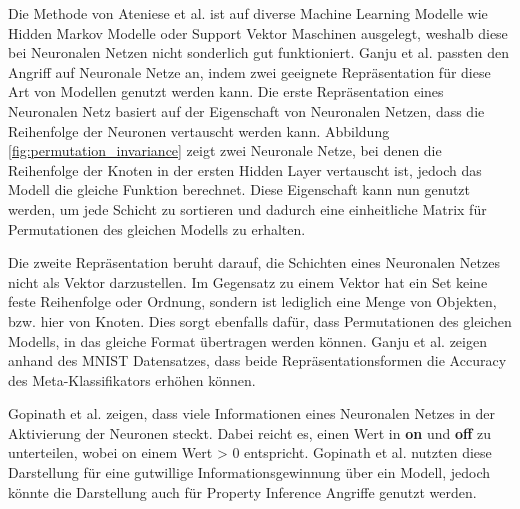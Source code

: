 Die Methode von Ateniese et al. \cite{P-80} ist auf diverse Machine Learning Modelle wie Hidden Markov Modelle oder Support Vektor Maschinen ausgelegt, weshalb diese bei Neuronalen Netzen nicht sonderlich gut funktioniert. 
Ganju et al. \cite{P-11} passten den Angriff auf Neuronale Netze an, indem zwei geeignete Repräsentation für diese Art von Modellen genutzt werden kann.
Die erste Repräsentation eines Neuronalen Netz basiert auf der Eigenschaft von Neuronalen Netzen, dass die Reihenfolge der Neuronen vertauscht werden kann. 
Abbildung \ref{fig:permutation_invariance} zeigt zwei Neuronale Netze, bei denen die Reihenfolge der Knoten in der ersten Hidden Layer vertauscht ist, jedoch das Modell die gleiche Funktion berechnet.
Diese Eigenschaft kann nun genutzt werden, um jede Schicht zu sortieren und dadurch eine einheitliche Matrix für Permutationen des gleichen Modells zu erhalten.

Die zweite Repräsentation beruht darauf, die Schichten eines Neuronalen Netzes nicht als Vektor darzustellen.
Im Gegensatz zu einem Vektor hat ein Set keine feste Reihenfolge oder Ordnung, sondern ist lediglich eine Menge von Objekten, bzw. hier von Knoten.
Dies sorgt ebenfalls dafür, dass Permutationen des gleichen Modells, in das gleiche Format übertragen werden können.
Ganju et al. \cite{P-11} zeigen anhand des MNIST Datensatzes, dass beide Repräsentationsformen die Accuracy des Meta-Klassifikators erhöhen können.

Gopinath et al. \cite{P-12} zeigen, dass viele Informationen eines Neuronalen Netzes in der Aktivierung der Neuronen steckt. 
Dabei reicht es, einen Wert in \textbf{on} und \textbf{off} zu unterteilen, wobei on einem Wert > 0 entspricht. 
Gopinath et al. \cite{P-12} nutzten diese Darstellung für eine gutwillige Informationsgewinnung über ein Modell, jedoch könnte die Darstellung auch für Property Inference Angriffe genutzt werden.